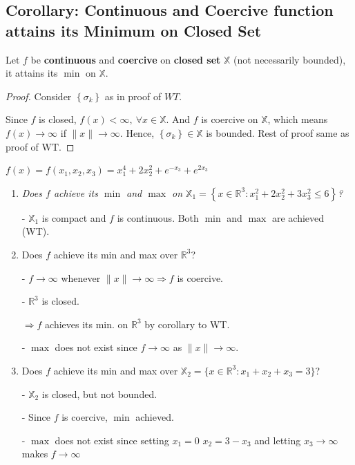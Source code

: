 \documentclass[11pt]{elegantbook}
\begin{document}
\subsection{Corollary: Continuous and Coercive function attains its Minimum on Closed Set}
\begin{corollary}
    Let $f$ be \textbf{continuous} and \textbf{coercive} on \textbf{closed set} $\mathbb{X}$ (not necessarily bounded), it attains its $\min$ on $\mathbb{X}$.
\end{corollary}
\begin{proof}
    Consider $\left\{\sigma_{k}\right\}$ as in proof of $WT$.

    Since $f$ is closed, $f(x)<\infty,\ \forall x\in\mathbb{X}$. And $f$ is coercive on $\mathbb{X}$, which means $f(x)\rightarrow \infty$ if $\|x\| \rightarrow\infty$. Hence, $\left\{\sigma_{k}\right\}\in\mathbb{X}$ is bounded. Rest of proof same as proof of $\mathrm{WT}$.
\end{proof}

\begin{example}
    $f(x)=f\left(x_{1}, x_{2}, x_{3}\right)=x_{1}^{4}+2 x_{2}^{2}+e^{-x_{3}}+e^{2 x_{3}}$
\end{example}

\begin{enumerate}[1)]
    \item \textit{Does $f$ achieve its $\min$ and $\max$ on $\mathbb{X}_{1}=\left\{x \in \mathbb{R}^{3}: x_{1}^{2}+2 x_{2}^{2}+3 x_{3}^{2} \leqslant 6\right\}$?}
    
    - $\mathbb{X}_{1}$ is compact and $f$ is continuous. Both $\min$ and $\max$ are achieved (WT).
    \item Does $f$ achieve its min and max over $\mathbb{R}^{3}$?
    
    - $f \rightarrow \infty$ whenever $\|x\| \rightarrow \infty \Rightarrow f$ is coercive.

    - $\mathbb{R}^{3}$ is closed.

    $\Rightarrow f$ achieves its min. on $\mathbb{R}^{3}$ by corollary to WT.

    - $\max$ does not exist since $f \rightarrow \infty$ as $\|x\| \rightarrow \infty$.

    \item Does $f$ achieve its min and max over $\mathbb{X}_{2}=\{x \in \mathbb{R}^{3}: x_{1}+x_{2}+x_{3}=3\}$?
    
    - $\mathbb{X}_{2}$ is closed, but not bounded.

    - Since $f$ is coercive, $\min$ achieved.

    - $\max$ does not exist since setting $x_{1}=0$ $x_{2}=3-x_{3}$ and letting $x_{3} \rightarrow \infty$ makes $f \rightarrow \infty$
\end{enumerate}
\end{document}

